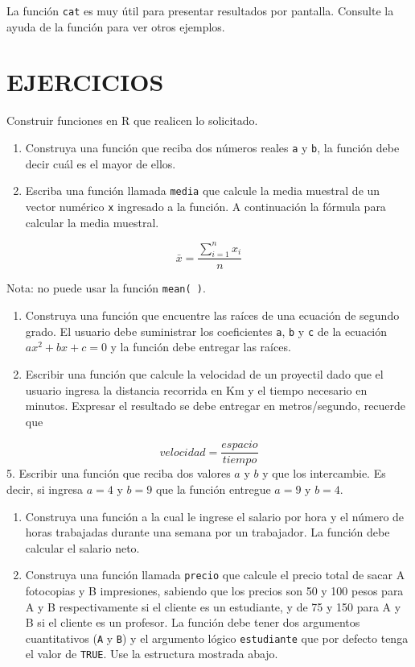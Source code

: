 \documentclass[10pt,]{krantz}
\let\BeginKnitrBlock\begin \let\EndKnitrBlock\end
\begin{document}
\BeginKnitrBlock{rmdnote}
La función \texttt{cat} es muy útil para presentar resultados por
pantalla. Consulte la ayuda de la función para ver otros ejemplos.
\EndKnitrBlock{rmdnote}

\section*{EJERCICIOS}\label{ejercicios-2}


Construir funciones en R que realicen lo solicitado.

\begin{enumerate}
\def\labelenumi{\arabic{enumi}.}
\item
  Construya una función que reciba dos números reales \texttt{a} y
  \texttt{b}, la función debe decir cuál es el mayor de ellos.
\item
  Escriba una función llamada \texttt{media} que calcule la media
  muestral de un vector numérico \texttt{x} ingresado a la función. A
  continuación la fórmula para calcular la media muestral.
\end{enumerate}

\[\bar{x}=\frac{\sum_{i=1}^n x_i}{n}\]

Nota: no puede usar la función \texttt{mean(\ )}.

\begin{enumerate}
\def\labelenumi{\arabic{enumi}.}
\setcounter{enumi}{2}
\item
  Construya una función que encuentre las raíces de una ecuación de
  segundo grado. El usuario debe suministrar los coeficientes
  \texttt{a}, \texttt{b} y \texttt{c} de la ecuación \(ax^2+bx+c=0\) y
  la función debe entregar las raíces.
\item
  Escribir una función que calcule la velocidad de un proyectil dado que
  el usuario ingresa la distancia recorrida en Km y el tiempo necesario
  en minutos. Expresar el resultado se debe entregar en metros/segundo,
  recuerde que
\end{enumerate}

\[velocidad = \frac{espacio}{tiempo}\] 5. Escribir una función que
reciba dos valores \(a\) y \(b\) y que los intercambie. Es decir, si
ingresa \(a=4\) y \(b=9\) que la función entregue \(a=9\) y \(b=4\).

\begin{enumerate}
\def\labelenumi{\arabic{enumi}.}
\setcounter{enumi}{5}
\item
  Construya una función a la cual le ingrese el salario por hora y el
  número de horas trabajadas durante una semana por un trabajador. La
  función debe calcular el salario neto.
\item
  Construya una función llamada \texttt{precio} que calcule el precio
  total de sacar A fotocopias y B impresiones, sabiendo que los precios
  son 50 y 100 pesos para A y B respectivamente si el cliente es un
  estudiante, y de 75 y 150 para A y B si el cliente es un profesor. La
  función debe tener dos argumentos cuantitativos (\texttt{A} y
  \texttt{B}) y el argumento lógico \texttt{estudiante} que por defecto
  tenga el valor de \texttt{TRUE}. Use la estructura mostrada abajo.
\end{enumerate}
\end{document}
